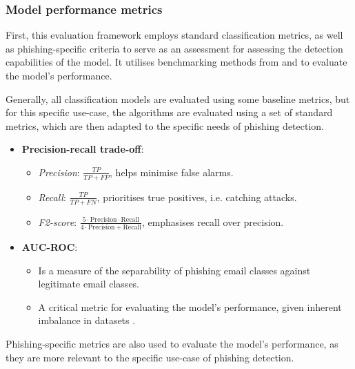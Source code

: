 
\subsubsection*{Model performance metrics}
First, this evaluation framework employs standard classification metrics, as well as phishing-specific criteria to serve as an assessment for assessing the detection capabilities of the model. It utilises benchmarking methods from \cite{kapoor2024comparative} and \cite{zamir2020phishing} to evaluate the model's performance.\newline

\noindent Generally, all classification models are evaluated using some baseline metrics, but for this specific use-case, the algorithms are evaluated using a set of standard metrics, which are then adapted to the specific needs of phishing detection.

\begin{itemize}
  \item \textbf{Precision-recall trade-off}:
  \begin{itemize}
    \item \textit{Precision}: $\frac{TP}{TP + FP}$, helps minimise false alarms.
    \item \textit{Recall}: $\frac{TP}{TP + FN}$, prioritises true positives, i.e. catching attacks.
    \item \textit{F2-score}: $\frac{5 \cdot \text{Precision} \cdot \text{Recall}}{4 \cdot \text{Precision} + \text{Recall}}$, emphasises recall over precision.
  \end{itemize}
  \item \textbf{AUC-ROC}:
  \begin{itemize}
    \item Is a measure of the separability of phishing email classes against legitimate email classes.
    \item A critical metric for evaluating the model's performance, given inherent imbalance in datasets \citep{ahmad2024across}.
  \end{itemize}
\end{itemize}

\noindent Phishing-specific metrics are also used to evaluate the model's performance, as they are more relevant to the specific use-case of phishing detection.

